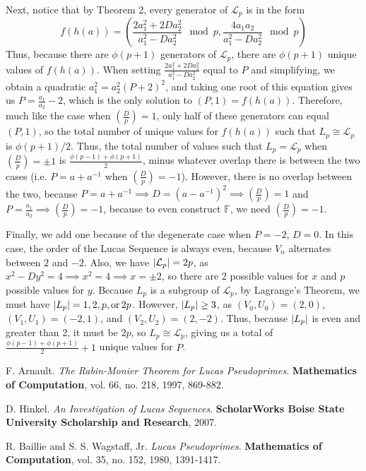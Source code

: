 \documentclass{article}
\DeclarePairedDelimiter{\abs}{\lvert}{\rvert}
\newcommand{\legendre}[2]{\genfrac{(}{)}{}{}{#1}{#2}}
\begin{document}
Next, notice that by Theorem 2, every generator of $\mathcal{L}_p$ is in the form $$f(h(a)) = \left ( \frac{2a_1^2 + 2Da_2^2}{a_1^2-Da_2^2} \mod p, \frac{4a_1a_2}{a_1^2-Da_2^2} \mod p \right )$$ Thus, because there are $\phi(p+1)$ generators of $\mathcal{L}_p$, there are $\phi(p+1)$ unique values of $f(h(a))$. When setting $\frac{2a_1^2 + 2Da_2^2}{a_1^2-Da_2^2}$ equal to $P$ and simplifying, we obtain a quadratic $a_1^2 = a_2^2(P+2)^2$, and taking one root of this equation gives us $P = \frac{a_1}{a_2} - 2$, which is the only solution to $(P,1) = f(h(a))$. Therefore, much like the case when $\legendre{D}{p} = 1$, only half of these generators can equal $(P,1)$, so the total number of unique values for $f(h(a))$ such that $L_p \cong \mathcal{L}_p$ is $\phi(p+1)/2$. Thus, the total number of values such that $L_p = \mathcal{L}_p$ when $\legendre{D}{p} = \pm 1$ is $\frac{\phi(p-1) + \phi(p+1)}{2}$, minus whatever overlap there is between the two cases (i.e. $P = a + a^{-1}$ when $\legendre{D}{p} = -1$). However, there is no overlap between the two, because $P = a + a^{-1} \implies D = (a-a^{-1})^2 \implies \legendre{D}{p} = 1$ and $P = \frac{a_1}{a_2} \implies \legendre{D}{p} = -1$, because to even construct $\mathbb{F}$, we need $\legendre{D}{p} = -1$. 

Finally, we add one because of the degenerate case when $P = -2$, $D = 0$. In this case, the order of the Lucas Sequence is always even, because $V_n$ alternates between $2$ and $-2$. Also, we have $\abs{\mathcal{L}_p} = 2p$, as $x^2 -Dy^2 = 4 \implies x^2 = 4 \implies x = \pm 2$, so there are 2 possible values for $x$ and $p$ possible values for $y$. Because $L_p$ is a subgroup of $\mathcal{L}_p$, by Lagrange's Theorem, we must have $\abs{L_p} = 1, 2, p, \text{or}\, 2p$. However, $\abs{L_p} \geq 3$, as $(V_0, U_0) = (2,0)$, $(V_1, U_1) = (-2,1)$, and $(V_2, U_2) = (2, -2)$. Thus, because $\abs{L_p}$ is even and greater than 2, it must be $2p$, so $L_p \cong \mathcal{L}_p$, giving us a total of $\frac{\phi(p-1) + \phi(p+1)}{2} + 1$ unique values for $P$. 



\begin{thebibliography}{3}

F. Arnault. \textit{The Rabin-Monier Theorem for Lucas Pseudoprimes}. \textbf{Mathematics of Computation}, vol. 66, no. 218, 1997, 869-882.

D. Hinkel. \textit{An Investigation of Lucas Sequences}. \textbf{ScholarWorks Boise State University Scholarship and Research}, 2007.

R. Baillie and S. S. Wagstaff, Jr. \textit{Lucas Pseudoprimes}. \textbf{Mathematics of Computation}, vol. 35, no. 152, 1980, 1391-1417.

\end{thebibliography}
\end{document}
